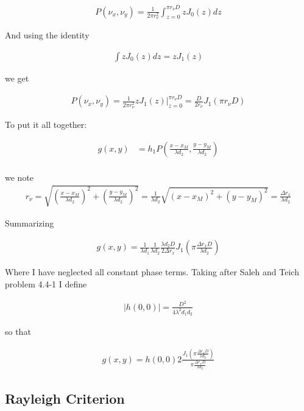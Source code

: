 \documentclass[12pt]{article}
\begin{document}
\begin{align}
P(\nu_x,\nu_y) = \frac{1}{2\pi r_{\nu}^2} \int_{z=0}^{\pi r_{\nu} D} z J_0(z) dz
\end{align}

And using the identity

\begin{align}
\int z J_0(z) dz = zJ_1(z)
\end{align}

we get

\begin{align}
P(\nu_x,\nu_y) = \frac{1}{2\pi r_{\nu}^2} zJ_1(z)\bigg|_{z=0}^{\pi r_{\nu} D} = \frac{D}{2r_{\nu}}J_1(\pi r_{\nu}D)
\end{align}

To put it all together:

\begin{align}
g(x,y) &= h_1 P\left(\frac{x-x_M}{\lambda d_2}, \frac{y-y_M}{\lambda d_2}\right)\\
\end{align}

we note 
\begin{align}
r_{\nu} = \sqrt{\left(\frac{x-x_M}{\lambda d_2}\right)^2 + \left(\frac{y-y_M}{\lambda d_2}\right)^2} = \frac{1}{\lambda d_2} \sqrt{(x-x_M)^2 + (y-y_M)^2} = \frac{\Delta r_x}{\lambda d_2}
\end{align}

Summarizing

\begin{align}
g(x,y) = \frac{1}{\lambda d_1} \frac{1}{\lambda d_2} \frac{\lambda d_2 D}{2 \Delta r_x}J_1\left(\pi \frac{\Delta r_x D}{\lambda d_2}\right)
\end{align}

Where I have neglected all constant phase terms. Taking after Saleh and Teich problem 4.4-1 I define

\begin{align}
|h(0,0)| = \frac{D^2}{4\lambda^2 d_1 d_2}
\end{align}

so that

\begin{align}
g(x,y) = h(0,0) 2\frac{J_1\left(\pi \frac{\Delta r_x D}{\lambda d_2}\right)}{\pi \frac{\Delta r_x D}{\lambda d_2}}
\end{align}

\subsection{Rayleigh Criterion}
\end{document}
